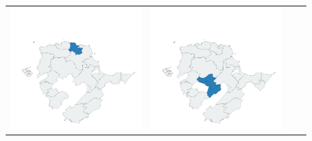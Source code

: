 \begin{figure}[p]
\begin{tabularx}{1\textwidth}{XXXX}
\includegraphics[width=1\linewidth]{images/ch6/loading/15}&
\includegraphics[width=1\linewidth]{images/ch6/loading/16} \\

\end{tabularx}
\end{figure}
